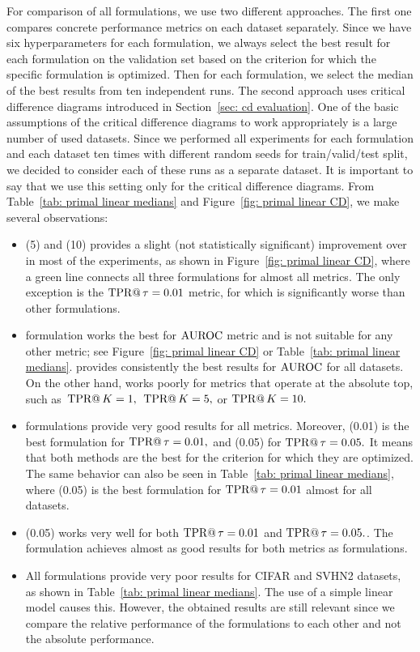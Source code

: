For comparison of all formulations, we use two different approaches. The first one compares concrete performance metrics on each dataset separately. Since we have six hyperparameters for each formulation, we always select the best result for each formulation on the validation set based on the criterion for which the specific formulation is optimized. Then for each formulation, we select the median of the best results from ten independent runs. The second approach uses critical difference diagrams introduced in Section~\ref{sec: cd evaluation}. One of the basic assumptions of the critical difference diagrams to work appropriately is a large number of used datasets. Since we performed all experiments for each formulation and each dataset ten times with different random seeds for train/valid/test split, we decided to consider each of these runs as a separate dataset. It is important to say that we use this setting only for the critical difference diagrams. From Table~\ref{tab: primal linear medians} and Figure~\ref{fig: primal linear CD}, we make several observations:
\begin{itemize}
  \item \TopPushK(5) and \TopPushK(10) provides a slight (not statistically significant) improvement over \TopPush in most of the experiments, as shown in Figure~\ref{fig: primal linear CD}, where a green line connects all three formulations for almost all metrics. The only exception is the $\operatorname{TPR@}\tau=0.01$ metric, for which \TopPush is significantly worse than other formulations.
  \item \BaseLine formulation works the best for $\operatorname{AUROC}$ metric and is not suitable for any other metric; see Figure~\ref{fig: primal linear CD} or Table~\ref{tab: primal linear medians}. \BaseLine provides consistently the best results for $\operatorname{AUROC}$ for all datasets. On the other hand, \BaseLine works poorly for metrics that operate at the absolute top, such as~$\operatorname{TPR@}K = 1,$~$\operatorname{TPR@}K = 5,$ or $\operatorname{TPR@}K = 10.$
  \item \PatMatNP formulations provide very good results for all metrics. Moreover, \PatMatNP(0.01) is the best formulation for $\operatorname{TPR@}\tau = 0.01,$ and \PatMatNP(0.05) for $\operatorname{TPR@}\tau = 0.05.$ It means that both methods are the best for the criterion for which they are optimized. The same behavior can also be seen in Table~\ref{tab: primal linear medians}, where \PatMatNP(0.05) is the best formulation for $\operatorname{TPR@}\tau = 0.01$ almost for all datasets.
  \item \tauFPL(0.05) works very well for both $\operatorname{TPR@}\tau = 0.01$ and $\operatorname{TPR@}\tau = 0.05.$. The formulation achieves almost as good results for both metrics as \PatMatNP formulations.
  \item All formulations provide very poor results for CIFAR and SVHN2 datasets, as shown in Table~\ref{tab: primal linear medians}. The use of a simple linear model causes this. However, the obtained results are still relevant since we compare the relative performance of the formulations to each other and not the absolute performance.
\end{itemize}


